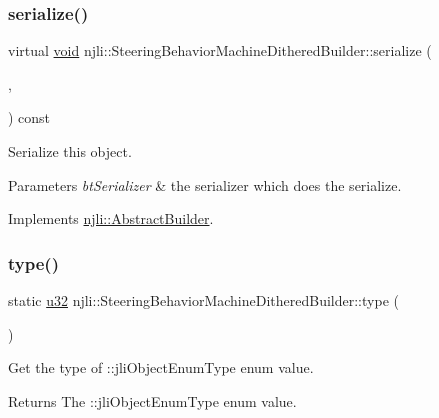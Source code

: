 \subsubsection{\texorpdfstring{serialize()}{serialize()}}
{\footnotesize\ttfamily virtual \mbox{\hyperlink{_thread_8h_af1e856da2e658414cb2456cb6f7ebc66}{void}} njli\+::\+Steering\+Behavior\+Machine\+Dithered\+Builder\+::serialize (\begin{DoxyParamCaption}\item[{\mbox{\hyperlink{_thread_8h_af1e856da2e658414cb2456cb6f7ebc66}{void}} $\ast$}]{,  }\item[{bt\+Serializer $\ast$}]{ }\end{DoxyParamCaption}) const\hspace{0.3cm}{\ttfamily [virtual]}}

Serialize this object.


\begin{DoxyParams}{Parameters}
{\em bt\+Serializer} & the serializer which does the serialize. \\
\hline
\end{DoxyParams}


Implements \mbox{\hyperlink{classnjli_1_1_abstract_builder_ab66b774e02ccb9da554c9aab7fa6d981}{njli\+::\+Abstract\+Builder}}.

\mbox{\label{classnjli_1_1_steering_behavior_machine_dithered_builder_ad8dda734039220b56819c987b5258ce1}} 
\subsubsection{\texorpdfstring{type()}{type()}}
{\footnotesize\ttfamily static \mbox{\hyperlink{_util_8h_a10e94b422ef0c20dcdec20d31a1f5049}{u32}} njli\+::\+Steering\+Behavior\+Machine\+Dithered\+Builder\+::type (\begin{DoxyParamCaption}{ }\end{DoxyParamCaption})\hspace{0.3cm}{\ttfamily [static]}}

Get the type of \+::jli\+Object\+Enum\+Type enum value.

\begin{DoxyReturn}{Returns}
The \+::jli\+Object\+Enum\+Type enum value. 
\end{DoxyReturn}


